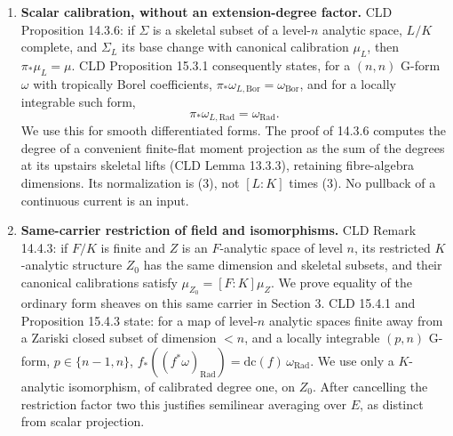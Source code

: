 \documentclass[
  11pt,
]{article}
\begin{document}
\begin{enumerate}
  their lengths. CLD 5.8.3--5 defines a top form's Radon measure by
  pairing the form with this calibration on its supporting skeleton. CLD
  Proposition 5.10.1(c) states: for a pleasant chart \(f\) and a Borel
  \((p,n)\) coefficient form \(\eta\), \(p\in\{n-1,n\}\), the associated
  Borel measure is locally finite precisely when the restricted
  coefficient form is locally integrable on the calibrated tropical
  polyhedron; then \(f_*((f^*\eta)_{\mathrm{Rad}})
      =\langle\eta,\mu_{\Pi_f}\rangle_{\mathrm{Rad}}\). Part (d), for
  \(p=n\), gives
  \(\int_X f^*\eta=\int_{\Pi_f}\langle\eta,\mu_{\Pi_f}\rangle\). Thus a
  smooth top form is finite on a compact moment domain. Lower
  dimensional cells carry no top measure. CLD 7.3.5 defines integration
  currents for locally integrable multipliers; continuous finite
  multipliers are locally integrable. The matrix estimate and fold
  total-variation bound needed here are proved in Sections 5 and 7.
\item
  \textbf{Scalar calibration, without an extension-degree factor.} CLD
  Proposition 14.3.6: if \(\Sigma\) is a skeletal subset of a
  level-\(n\) analytic space, \(L/K\) complete, and \(\Sigma_L\) its
  base change with canonical calibration \(\mu_L\), then
  \(\pi_*\mu_L=\mu\). CLD Proposition 15.3.1 consequently states, for a
  \((n,n)\) G-form \(\omega\) with tropically Borel coefficients,
  \(\pi_*\omega_{L,\mathrm{Bor}}=\omega_{\mathrm{Bor}}\), and for a
  locally integrable such form, \[
    \pi_*\omega_{L,\mathrm{Rad}}=\omega_{\mathrm{Rad}}.       \tag{3}
  \] We use this for smooth differentiated forms. The proof of 14.3.6
  computes the degree of a convenient finite-flat moment projection as
  the sum of the degrees at its upstairs skeletal lifts (CLD Lemma
  13.3.3), retaining fibre-algebra dimensions. Its normalization is (3),
  not \([L:K]\) times (3). No pullback of a continuous current is an
  input.
\item
  \textbf{Same-carrier restriction of field and isomorphisms.} CLD
  Remark 14.4.3: if \(F/K\) is finite and \(Z\) is an \(F\)-analytic
  space of level \(n\), its restricted \(K\)-analytic structure \(Z_0\)
  has the same dimension and skeletal subsets, and their canonical
  calibrations satisfy \(\mu_{Z_0}=[F:K]\mu_Z\). We prove equality of
  the ordinary form sheaves on this same carrier in Section 3. CLD
  15.4.1 and Proposition 15.4.3 state: for a map of level-\(n\) analytic
  spaces finite away from a Zariski closed subset of dimension \(<n\),
  and a locally integrable \((p,n)\) G-form, \(p\in\{n-1,n\}\),
  \(f_*((f^*\omega)_{\mathrm{Rad}})
      =\mathrm{dc}(f)\,\omega_{\mathrm{Rad}}\). We use only a
  \(K\)-analytic isomorphism, of calibrated degree one, on \(Z_0\).
  After cancelling the restriction factor two this justifies semilinear
  averaging over \(E\), as distinct from scalar projection.
\end{enumerate}
\end{document}
